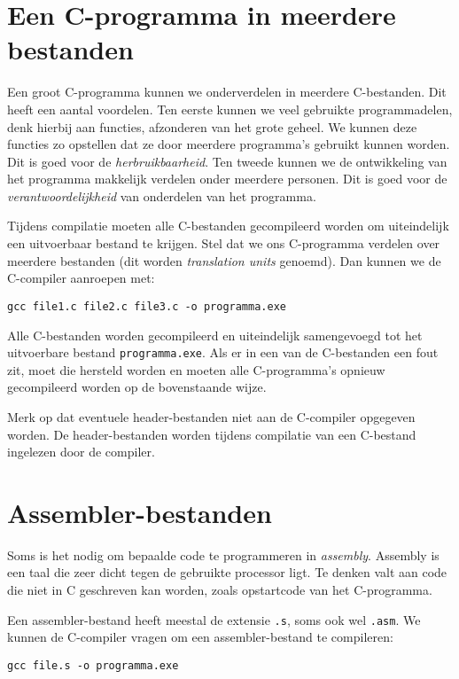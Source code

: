 \section{Een C-programma in meerdere bestanden}
Een groot C-programma kunnen we onderverdelen in meerdere C-bestanden. Dit heeft een aantal voordelen. Ten eerste kunnen we veel gebruikte programmadelen, denk hierbij aan functies, afzonderen van het grote geheel. We kunnen deze functies zo opstellen dat ze door meerdere programma's gebruikt kunnen worden. Dit is goed voor de \textsl{herbruikbaarheid}. Ten tweede kunnen we de ontwikkeling van het programma makkelijk verdelen onder meerdere personen. Dit is goed voor de \textsl{verantwoordelijkheid} van onderdelen van het programma. 

Tijdens compilatie moeten alle C-bestanden gecompileerd worden om uiteindelijk een uitvoerbaar bestand te krijgen. Stel dat we ons C-programma verdelen over meerdere bestanden (dit worden \textsl{translation units} genoemd). Dan kunnen we de C-compiler aanroepen met:

\hspace*{1em}\texttt{gcc file1.c file2.c file3.c -o programma.exe}

Alle C-bestanden worden gecompileerd en uiteindelijk samengevoegd tot het uitvoerbare bestand \texttt{programma.exe}.
Als er in een van de C-bestanden een fout zit, moet die hersteld worden en moeten alle C-programma's opnieuw gecompileerd worden op de bovenstaande wijze.

Merk op dat eventuele header-bestanden niet aan de C-compiler opgegeven worden. De header-bestanden worden tijdens compilatie van een C-bestand ingelezen door de compiler.

\section{Assembler-bestanden}
Soms is het nodig om bepaalde code te programmeren in \textit{assembly}. Assembly is een taal die zeer dicht tegen de gebruikte processor ligt. Te denken valt aan code die niet in C geschreven kan worden, zoals opstartcode van het C-programma.

Een assembler-bestand heeft meestal de extensie \texttt{.s}, soms ook wel \texttt{.asm}. We kunnen de C-compiler vragen om een assembler-bestand te compileren:

\hspace*{1em}\texttt{gcc file.s -o programma.exe}

